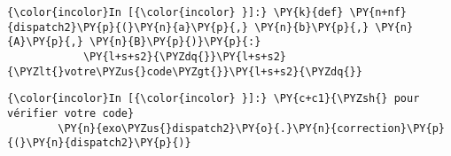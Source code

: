 
    \begin{Verbatim}[commandchars=\\\{\}]
{\color{incolor}In [{\color{incolor} }]:} \PY{k}{def} \PY{n+nf}{dispatch2}\PY{p}{(}\PY{n}{a}\PY{p}{,} \PY{n}{b}\PY{p}{,} \PY{n}{A}\PY{p}{,} \PY{n}{B}\PY{p}{)}\PY{p}{:}
            \PY{l+s+s2}{\PYZdq{}}\PY{l+s+s2}{\PYZlt{}votre\PYZus{}code\PYZgt{}}\PY{l+s+s2}{\PYZdq{}}
\end{Verbatim}


    \begin{Verbatim}[commandchars=\\\{\}]
{\color{incolor}In [{\color{incolor} }]:} \PY{c+c1}{\PYZsh{} pour vérifier votre code}
        \PY{n}{exo\PYZus{}dispatch2}\PY{o}{.}\PY{n}{correction}\PY{p}{(}\PY{n}{dispatch2}\PY{p}{)}
\end{Verbatim}